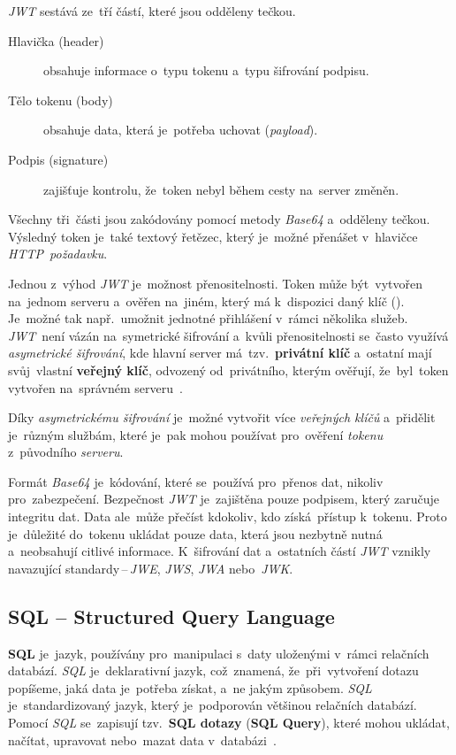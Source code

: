 \documentclass[11pt,a4paper]{report}
\begin{document}
                \emph{JWT} sestává ze~tří částí, které jsou odděleny tečkou.
                
                \begin{description}
                    \item[Hlavička (header)] obsahuje informace o~typu tokenu a~typu šifrování podpisu.
                    \item[Tělo tokenu (body)] obsahuje data, která je~potřeba uchovat (\emph{payload}).
                    \item[Podpis (signature)] zajišťuje kontrolu, že~token nebyl během cesty na~server změněn.
                \end{description}

                Všechny tři~části jsou zakódovány pomocí metody \emph{Base64} a~odděleny tečkou. Výsledný token je~také textový řetězec, který je~možné přenášet v~hlavičce \emph{HTTP~požadavku}.

                Jednou z~výhod \emph{JWT} je~možnost přenositelnosti. Token může být~vytvořen na~jednom serveru a~ověřen na~jiném, který má k~dispozici daný klíč (\cite{ieee:jwt}). Je~možné tak např.~umožnit jednotné přihlášení v~rámci několika služeb. \emph{JWT}~není vázán na~symetrické šifrování a~kvůli přenositelnosti se~často využívá \emph{asymetrické šifrování}, kde hlavní server má~tzv.~\textbf{privátní klíč} a~ostatní mají svůj~vlastní \textbf{veřejný klíč}, odvozený od~privátního, kterým ověřují, že~byl~token vytvořen na~správném serveru~\cite{miguelgrinbergJSONTokens}.
                
                Díky \emph{asymetrickému šifrování} je~možné vytvořit více \emph{veřejných klíčů} a~přidělit je~různým službám, které je~pak mohou používat pro~ověření \emph{tokenu} z~původního \emph{serveru}.

                Formát \emph{Base64} je~kódování, které se~používá pro~přenos dat, nikoliv pro~zabezpečení. Bezpečnost \emph{JWT} je~zajištěna pouze podpisem, který zaručuje integritu dat. Data ale~může přečíst kdokoliv, kdo získá~přístup k~tokenu. Proto je~důležité do~tokenu ukládat pouze data, která jsou nezbytně nutná a~neobsahují citlivé informace. K~šifrování dat a~ostatních částí \emph{JWT} vznikly navazující standardy\,--\,\emph{JWE}, \emph{JWS}, \emph{JWA} nebo~\emph{JWK}.~\cite{jwtesak, graham2021ethical}

            \subsection{SQL -- Structured Query Language}
            \textbf{SQL} je~jazyk, používány pro~manipulaci s~daty uloženými v~rámci relačních databází. \emph{SQL} je~deklarativní jazyk, což~znamená, že~při~vytvoření dotazu popíšeme, jaká data je~potřeba získat, a~ne jakým způsobem. \emph{SQL} je~standardizovaný jazyk, který je~podporován většinou relačních databází. Pomocí \emph{SQL} se~zapisují tzv.~\textbf{SQL dotazy} (\textbf{SQL Query}), které mohou ukládat, načítat, upravovat nebo~mazat data v~databázi~\cite{laurencik2018sql}.
\end{document}
